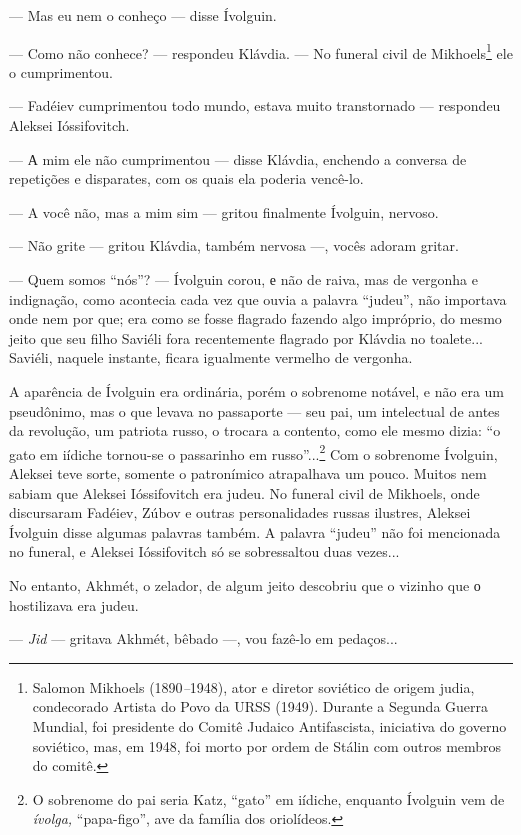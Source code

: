 --- Mas eu nem o conheço --- disse Ívolguin.

--- Como não conhece? --- respondeu Klávdia. --- No funeral civil de
Mikhoels\footnote{Salomon Mikhoels (1890\emph{--}1948), ator e diretor
  soviético de origem judia, condecorado Artista do Povo da URSS (1949).
  Durante a Segunda Guerra Mundial, foi presidente do Comitê Judaico
  Antifascista, iniciativa do governo soviético, mas, em 1948, foi morto
  por ordem de Stálin com outros membros do comitê.} ele o cumprimentou.

--- Fadéiev cumprimentou todo mundo, estava muito transtornado ---
respondeu Aleksei Ióssifovitch.

--- А mim ele não cumprimentou --- disse Klávdia, enchendo a conversa de
repetições e disparates, com os quais ela poderia vencê-lo.

--- A você não, mas a mim sim --- gritou finalmente Ívolguin, nervoso.

--- Não grite --- gritou Klávdia, também nervosa ---, vocês adoram
gritar.

--- Quem somos ``nós''? --- Ívolguin corou, е não de raiva, mas de
vergonha e indignação, como acontecia cada vez que ouvia a palavra
``judeu'', não importava onde nem por que; era como se fosse flagrado
fazendo algo impróprio, do mesmo jeito que seu filho Saviéli fora
recentemente flagrado por Klávdia no toalete... Saviéli, naquele
instante, ficara igualmente vermelho de vergonha.

A aparência de Ívolguin era ordinária, porém o sobrenome notável, e não
era um pseudônimo, mas o que levava no passaporte --- seu pai, um
intelectual de antes da revolução, um patriota russo, o trocara a
contento, como ele mesmo dizia: ``o gato em iídiche tornou-se o
passarinho em russo''...\footnote{O sobrenome do pai seria Katz,
  ``gato'' em iídiche, enquanto Ívolguin vem de \emph{ívolga,}
  ``papa-figo'', ave da família dos oriolídeos.} Com o sobrenome
Ívolguin, Aleksei teve sorte, somente o patronímico atrapalhava um
pouco. Muitos nem sabiam que Aleksei Ióssifovitch era judeu. No funeral
civil de Mikhoels, onde discursaram Fadéiev, Zúbov e outras
personalidades russas ilustres, Aleksei Ívolguin disse algumas palavras
também. A palavra ``judeu'' não foi mencionada no funeral, e Aleksei
Ióssifovitch só se sobressaltou duas vezes...

No entanto, Akhmét, o zelador, de algum jeito descobriu que o vizinho
que о hostilizava era judeu.

--- \emph{Jid} --- gritava Akhmét, bêbado ---, vou fazê-lo em pedaços...

